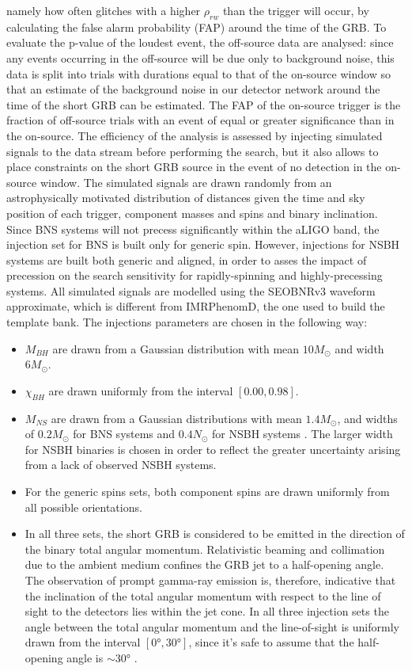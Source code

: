 \documentclass[binding=0.6cm, LaM]{sapthesis}
\begin{document}
	namely how often glitches with a higher $\rho_{rw}$ than the trigger will occur,
	by calculating the false alarm probability (FAP) around the time of the GRB.
	To evaluate the p-value of the loudest event, the off-source data are analysed:
	since any events occurring in the off-source will be due only to background noise, 
	this data is split into trials with durations equal to that of the on-source window 
	so that an estimate of the background noise in our detector network around the time of the short GRB can be estimated.
	The FAP of the on-source trigger is the fraction of off-source trials with an event of equal or greater significance than in the on-source. 
        The efficiency of the analysis is assessed by injecting simulated signals to the data stream before performing the search,
 	but it also allows to place constraints on the short GRB source in the event of no detection in the on-source window. 
        The simulated signals are drawn randomly from an astrophysically motivated distribution of distances given the time and sky position of each trigger, 
	component masses and spins and binary inclination. 
	Since BNS systems will not precess significantly within the aLIGO band, the injection set for BNS is built only for generic spin.
	However, injections for NSBH systems are built both generic and aligned,
	in order to asses the impact of precession on the search sensitivity for rapidly-spinning and highly-precessing systems.
	All simulated signals are modelled using the SEOBNRv3 waveform approximate, which is different from IMRPhenomD,
	the one used to build the template bank. 
	The injections parameters are chosen in the following way:
		\begin{itemize}
			\item $M_{BH}$ are drawn from a Gaussian distribution with mean $10M_\odot$ and width $6M_\odot$.
			\item $\chi_{BH}$ are drawn uniformly from the interval $[0.00, 0.98]$.
			\item $M_{NS}$ are drawn from a Gaussian distributions with mean $1.4M_\odot$, 
				 and widths of $0.2M_\odot$ for BNS systems and $0.4N_\odot$ for NSBH systems \cite{}. 
				 The larger width for NSBH binaries is chosen in order to reflect the greater uncertainty arising from a lack of observed NSBH systems. 
			\item For the generic spins sets, both component spins are drawn uniformly from all possible orientations. 
			\item In all three sets, the short GRB is considered to be emitted in the direction of the binary total angular momentum. 
				 Relativistic beaming and collimation due to the ambient medium confines the GRB jet to a half-opening angle. 
				 The observation of prompt gamma-ray emission is, therefore, indicative that the inclination of the total angular momentum 
				 with respect to the line of sight to the detectors lies within the jet cone. 
				 In all three injection sets the angle between the total angular momentum and the line-of-sight is uniformly drawn from the interval $[\ang{0}, \ang{30}]$,
				 since it’s safe to assume that the half-opening angle is $\sim \ang{30}$ \cite{}.
		\end{itemize}
\end{document}

